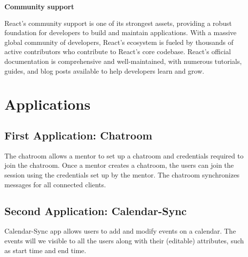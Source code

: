 \textbf{Community support}

React’s community support is one of its strongest assets, providing a robust foundation for developers to build and maintain applications. With a massive global community of developers, React’s ecosystem is fueled by thousands of active contributors who contribute to React’s core codebase. React’s official documentation is comprehensive and well-maintained, with numerous tutorials, guides, and blog posts available to help developers learn and grow. 

\section{Applications}
\label{section:applications}

\subsection{First Application: Chatroom}


The chatroom allows a mentor to set up a chatroom and credentials required to join the chatroom. Once a mentor creates a chatroom, the users can join the session using the credentials set up by the mentor. The chatroom synchronizes messages for all connected clients.

\subsection{Second Application: Calendar-Sync}

Calendar-Sync app allows users to add and modify events on a calendar. The events will we visible to all the users along with their (editable) attributes, such as start time and end time. 


